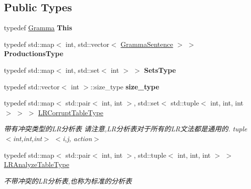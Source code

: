 \subsection*{Public Types}
\begin{DoxyCompactItemize}
\item 
\mbox{\label{classx2_1_1_gramma_aa8b50e42698370df0a3dbe44e8c6f182}} 
typedef \hyperlink{classx2_1_1_gramma}{Gramma} {\bfseries This}
\item 
\mbox{\label{classx2_1_1_gramma_abbd7903e9220c50d0fc76a327b57fb1c}} 
typedef std\+::map$<$ int, std\+::vector$<$ \hyperlink{classx2_1_1_gramma_sentence}{Gramma\+Sentence} $>$ $>$ {\bfseries Productions\+Type}
\item 
\mbox{\label{classx2_1_1_gramma_a49dba600dd70cf11797ec8b887712cfd}} 
typedef std\+::map$<$ int, std\+::set$<$ int $>$ $>$ {\bfseries Sets\+Type}
\item 
\mbox{\label{classx2_1_1_gramma_aff012603885ff5f5618774fc210fb3d1}} 
typedef std\+::vector$<$ int $>$\+::size\+\_\+type {\bfseries size\+\_\+type}
\item 
\mbox{\label{classx2_1_1_gramma_a03901eb5b196689b901fbf23e5bb9f0e}} 
typedef std\+::map$<$ std\+::pair$<$ int, int $>$, std\+::set$<$ std\+::tuple$<$ int, int, int $>$ $>$ $>$ \hyperlink{classx2_1_1_gramma_a03901eb5b196689b901fbf23e5bb9f0e}{L\+R\+Corrupt\+Table\+Type}
\begin{DoxyCompactList}\small\item\em 带有冲突类型的\+L\+R分析表  请注意,L\+R分析表对于所有的\+L\+R文法都是通用的. tuple$<$int,int,int$>$ $<$i,j, action$>$ \end{DoxyCompactList}\item 
\mbox{\label{classx2_1_1_gramma_a33681053b045219ea58cc68c3faa4975}} 
typedef std\+::map$<$ std\+::pair$<$ int, int $>$, std\+::tuple$<$ int, int, int $>$ $>$ \hyperlink{classx2_1_1_gramma_a33681053b045219ea58cc68c3faa4975}{L\+R\+Analyze\+Table\+Type}
\begin{DoxyCompactList}\small\item\em 不带冲突的\+L\+R分析表,也称为标准的分析表 \end{DoxyCompactList}\end{DoxyCompactItemize}
